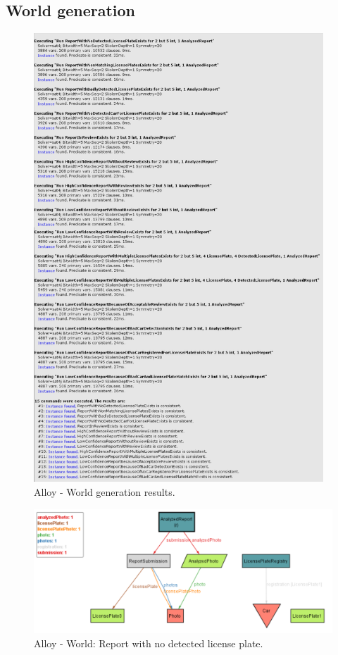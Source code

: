 \subsection{World generation}



\begin{figure}[H]
    \centering
    \includegraphics[width=0.97\textwidth]{Images/alloy/worldgen.png}
    \caption{\label{fig:alloy}Alloy - World generation results.}
\end{figure}

\begin{figure}[H]
    \centering
    \includegraphics[width=\textwidth]{Images/alloy/1.png}
    \caption{\label{fig:alloy}Alloy - World: Report with no detected license plate.}
\end{figure}

